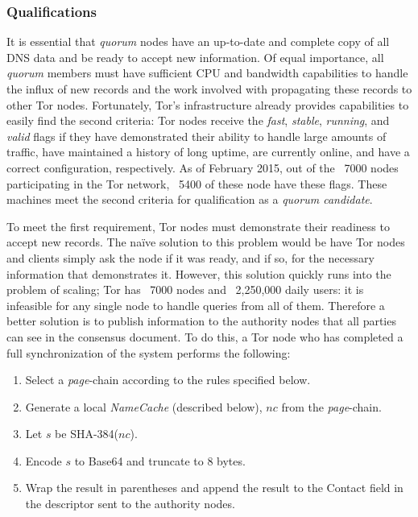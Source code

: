 \subsubsection{Qualifications}

It is essential that \emph{quorum} nodes have an up-to-date and complete copy of all DNS data and be ready to accept new information. Of equal importance, all \emph{quorum} members must have sufficient CPU and bandwidth capabilities to handle the influx of new records and the work involved with propagating these records to other Tor nodes. Fortunately, Tor's infrastructure already provides capabilities to easily find the second criteria: Tor nodes receive the \emph{fast}, \emph{stable}, \emph{running},  and \emph{valid} flags if they have demonstrated their ability to handle large amounts of traffic, have maintained a history of long uptime, are currently online, and have a correct configuration, respectively. As of February 2015, out of the ~7000 nodes participating in the Tor network, ~5400 of these node have these flags. These machines meet the second criteria for qualification as a \emph{quorum candidate}.

To meet the first requirement, Tor nodes must demonstrate their readiness to accept new records. The na\"{i}ve solution to this problem would be have Tor nodes and clients simply ask the node if it was ready, and if so, for the necessary information that demonstrates it. However, this solution quickly runs into the problem of scaling; Tor has ~7000 nodes and ~2,250,000 daily users\cite{TorMetrics}: it is infeasible for any single node to handle queries from all of them. Therefore a better solution is to publish information to the authority nodes that all parties can see in the consensus document. To do this, a Tor node who has completed a full synchronization of the system performs the following:

\begin{enumerate}
	\item Select a \emph{page}-chain according to the rules specified below.
	\item Generate a local \emph{NameCache} (described below), $ nc $ from the \emph{page}-chain.
	\item Let $ s $ be SHA-384($ nc $).
	\item Encode $ s $ to Base64 and truncate to 8 bytes.
	\item Wrap the result in parentheses and append the result to the Contact field in the descriptor sent to the authority nodes.
\end{enumerate}

